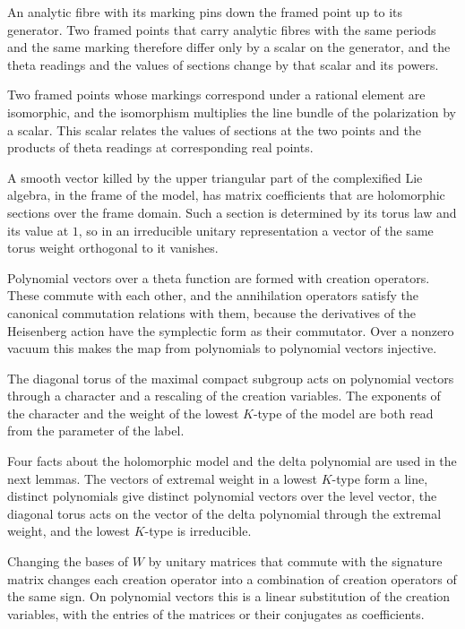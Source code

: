 An analytic fibre with its marking pins down the framed point up to its generator. Two framed points that carry
analytic fibres with the same periods and the same marking therefore differ only by a scalar on the generator, and
the theta readings and the values of sections change by that scalar and its powers.

Two framed points whose markings correspond under a rational element are isomorphic, and the isomorphism
multiplies the line bundle of the polarization by a scalar. This scalar relates the values of sections at
the two points and the products of theta readings at corresponding real points.

A smooth vector killed by the upper triangular part of the complexified Lie algebra, in the frame of the model,
has matrix coefficients that are holomorphic sections over the frame domain. Such a section is determined by its
torus law and its value at $1$, so in an irreducible unitary representation a vector of the same torus weight
orthogonal to it vanishes.

Polynomial vectors over a theta function are formed with creation operators. These commute with each other,
and the annihilation operators satisfy the canonical commutation relations with them, because the derivatives
of the Heisenberg action have the symplectic form as their commutator. Over a nonzero vacuum this makes the map
from polynomials to polynomial vectors injective.

The diagonal torus of the maximal compact subgroup acts on polynomial vectors through a character and a
rescaling of the creation variables. The exponents of the character and the weight of the lowest $K$-type of
the model are both read from the parameter of the label.

Four facts about the holomorphic model and the delta polynomial are used in the next lemmas. The vectors of
extremal weight in a lowest $K$-type form a line, distinct polynomials give distinct polynomial vectors over the
level vector, the diagonal torus acts on the vector of the delta polynomial through the extremal weight, and the
lowest $K$-type is irreducible.

Changing the bases of $W$ by unitary matrices that commute with the signature matrix changes each creation
operator into a combination of creation operators of the same sign. On polynomial vectors this is a linear
substitution of the creation variables, with the entries of the matrices or their conjugates as coefficients.

